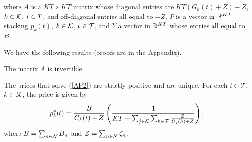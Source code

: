 %
where $A$ is a $KT\times KT$ matrix 
whose diagonal entries are $KT(G_k(t)+Z)-Z$, $k\in{\cal K}$, $t\in{\cal T}$,
and off-diagonal entries all equal to $-Z$, 
$P$ is a vector in $\mathbb{R}^{KT}$ stacking $p_k(t)$, $k\in{\cal K}$, $t\in{\cal T}$,
and $Y$ a vector in $\mathbb{R}^{KT}$ whose entries all equal to $B$.

We have the following results (proofs are in the Appendix).
\begin{lemma}
The matrix $A$ is invertible.
\end{lemma}


\begin{lemma}
The prices that solve (\ref{AP2}) are strictly positive and are unique. For each $t\in\mathcal{T}$, $k\in\mathcal{K}$, the price is given by
    \begin{equation} p^*_k(t)=\frac{B}{G_k(t)+Z}\left(\frac{1}{KT-\sum_{j\in {\cal K}}\sum_{h\in {\cal T}}\frac{Z}{G_j(h)+Z}}\right),\label{p}\end{equation}
where $B=\sum_{n\in {\cal N}}B_n$ and $Z=\sum_{n\in {\cal N}}\zeta_n$.
\end{lemma}


